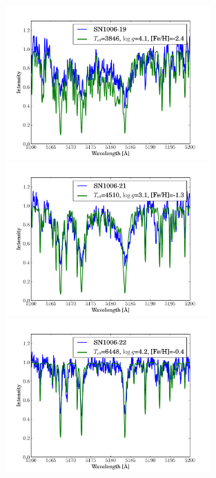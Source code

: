 \begin{figure}[htbp]
   \label{fig:sn1006_candfit}
\end{figure}\begin{figure}[htbp] %
   \centering
\includegraphics[width=0.7\textwidth, trim=0 0mm 0 10mm, clip]{chapter_sn1006/plots/gold_spectra/sn1006_19.pdf}
\includegraphics[width=0.7\textwidth, trim=0 0mm 0 10mm, clip]{chapter_sn1006/plots/gold_spectra/sn1006_21.pdf}
\includegraphics[width=0.7\textwidth, trim=0 0mm 0 10mm, clip]{chapter_sn1006/plots/gold_spectra/sn1006_22.pdf}


\end{figure}
